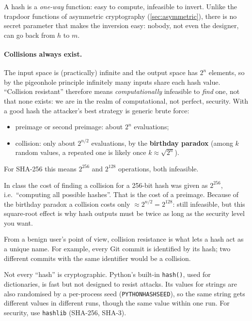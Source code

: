 \begin{remark}
A hash is a \emph{one-way} function: easy to compute, infeasible to invert. Unlike the trapdoor functions of asymmetric cryptography (\cref{sec:asymmetric}), there is no secret parameter that makes the inversion easy: nobody, not even the designer, can go back from $h$ to $m$.
\end{remark}

\paragraph{Collisions always exist.} The input space is (practically) infinite and the output space has $2^n$ elements, so by the pigeonhole principle infinitely many inputs share each hash value. \enquote{Collision resistant} therefore means \emph{computationally} infeasible to \emph{find} one, not that none exists: we are in the realm of computational, not perfect, security. With a good hash the attacker's best strategy is generic brute force:
\begin{itemize}
    \item preimage or second preimage: about $2^n$ evaluations;
    \item collision: only about $2^{n/2}$ evaluations, by the \textbf{birthday paradox} (among $k$ random values, a repeated one is likely once $k \approx \sqrt{2^n}$).
\end{itemize}
For SHA-256 this means $2^{256}$ and $2^{128}$ operations, both infeasible.

\begin{remark}
In class the cost of finding a collision for a 256-bit hash was given as $2^{256}$, i.e.\ \enquote{computing all possible hashes}. That is the cost of a preimage. Because of the birthday paradox a collision costs only $\approx 2^{n/2} = 2^{128}$: still infeasible, but this square-root effect is why hash outputs must be twice as long as the security level you want.
\end{remark}

From a benign user's point of view, collision resistance is what lets a hash act as a unique name. For example, every Git commit is identified by its hash; two different commits with the same identifier would be a collision.

\begin{remark}
Not every \enquote{hash} is cryptographic. Python's built-in \texttt{hash()}, used for dictionaries, is fast but not designed to resist attacks. Its values for strings are also randomised by a per-process seed (\texttt{PYTHONHASHSEED}), so the same string gets different values in different runs, though the same value within one run. For security, use \texttt{hashlib} (SHA-256, SHA-3).
\end{remark}

